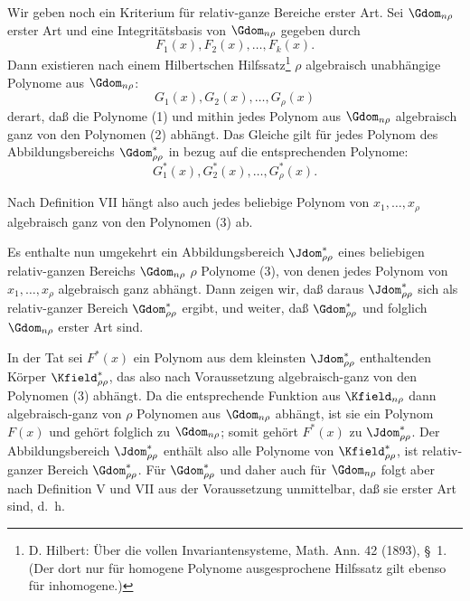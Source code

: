 \documentclass[11pt]{article}
\begin{document}
Wir geben noch ein Kriterium für relativ-ganze Bereiche erster Art. Sei $\Gdom_{n\rho}$ erster Art und eine Integritätsbasis von $\Gdom_{n\rho}$ gegeben durch
\begin{equation}
  F_1(x),F_2(x),\ldots,F_k(x).
\tag{1}
\end{equation}
Dann existieren nach einem Hilbertschen Hilfssatz\footnote{D. Hilbert: Über die vollen Invariantensysteme, Math. Ann. 42 (1893), \S\ 1. (Der dort nur für homogene Polynome ausgesprochene Hilfssatz gilt ebenso für inhomogene.)} $\rho$ algebraisch unabhängige Polynome aus $\Gdom_{n\rho}$:
\begin{equation}
  G_1(x),G_2(x),\ldots,G_\rho(x)
\tag{2}
\end{equation}
derart, daß die Polynome (1) und mithin jedes Polynom aus $\Gdom_{n\rho}$ algebraisch ganz von den Polynomen (2) abhängt. Das Gleiche gilt für jedes Polynom des Abbildungsbereichs $\Gdom^*_{\rho\rho}$ in bezug auf die entsprechenden Polynome:
\begin{equation}
  G_1^*(x),G_2^*(x),\ldots,G_\rho^*(x).
\tag{3}
\end{equation}

Nach Definition VII hängt also auch jedes beliebige Polynom von $x_1,
\ldots,x_\rho$ algebraisch ganz von den Polynomen (3) ab.

Es enthalte nun umgekehrt ein Abbildungsbereich $\Jdom^*_{\rho\rho}$ eines beliebigen relativ-ganzen Bereichs $\Gdom_{n\rho}$ $\rho$ Polynome (3), von denen jedes Polynom von $x_1,
\ldots,x_\rho$ algebraisch ganz abhängt. Dann zeigen wir, daß daraus $\Jdom^*_{\rho\rho}$ sich als relativ-ganzer Bereich $\Gdom^*_{\rho\rho}$ ergibt, und weiter, daß $\Gdom^*_{\rho\rho}$ und folglich $\Gdom_{n\rho}$ erster Art sind.

In der Tat sei $F^*(x)$ ein Polynom aus dem kleinsten $\Jdom^*_{\rho\rho}$ enthaltenden Körper $\Kfield^*_{\rho\rho}$, das also nach Voraussetzung algebraisch-ganz von den Polynomen (3) abhängt. Da die entsprechende Funktion aus $\Kfield_{n\rho}$ dann algebraisch-ganz von $\rho$ Polynomen aus $\Gdom_{n\rho}$ abhängt, ist sie ein Polynom $F(x)$ und gehört folglich zu $\Gdom_{n\rho}$; somit gehört $F^*(x)$ zu $\Jdom^*_{\rho\rho}$. Der Abbildungsbereich $\Jdom^*_{\rho\rho}$ enthält also alle Polynome von $\Kfield^*_{\rho\rho}$, ist relativ-ganzer Bereich $\Gdom^*_{\rho\rho}$. Für $\Gdom^*_{\rho\rho}$ und daher auch für $\Gdom_{n\rho}$ folgt aber nach Definition V und VII aus der Voraussetzung unmittelbar, daß sie erster Art sind, d.~h.
\end{document}
